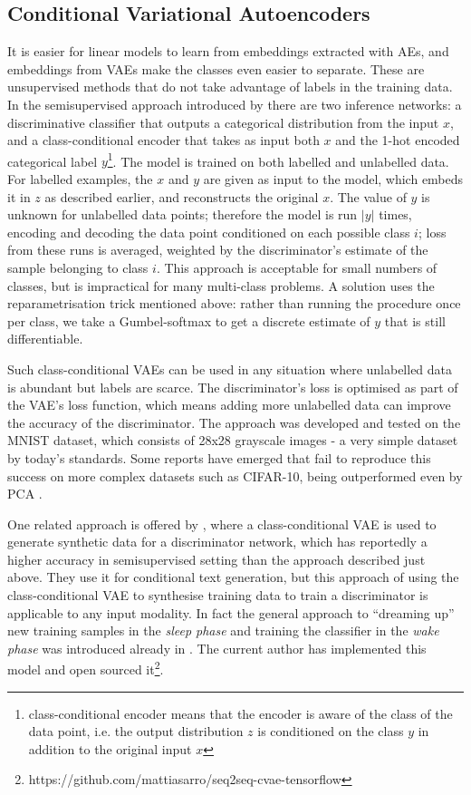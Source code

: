 \subsection{Conditional Variational Autoencoders}
\label{gans}
It is easier for linear models to learn from embeddings extracted with AEs, and embeddings from VAEs make the classes even easier to separate.
These are unsupervised methods that do not take advantage of labels in the training data.
In the semisupervised approach introduced by \cite{semi_vae} there are two inference networks: a discriminative classifier that outputs a categorical distribution from the input $x$, and a class-conditional encoder that takes as input both $x$ and the 1-hot encoded categorical label $y$\footnote{class-conditional encoder means that the encoder is aware of the class of the data point, i.e. the output distribution $z$ is conditioned on the class $y$ in addition to the original input $x$}.
The model is trained on both labelled and unlabelled data.
For labelled examples, the $x$ and $y$ are given as input to the model, which embeds it in $z$ as described earlier, and reconstructs the original $x$.
The value of $y$ is unknown for unlabelled data points; therefore the model is run $|y|$ times, encoding and decoding the data point conditioned on each possible class $i$; loss from these runs is averaged, weighted by the discriminator's estimate of the sample belonging to class $i$.
This approach is acceptable for small numbers of classes, but is impractical for many multi-class problems.
A solution uses the reparametrisation trick mentioned above: rather than running the procedure once per class, we take a Gumbel-softmax \cite{gumbel} to get a discrete estimate of $y$ that is still differentiable.

Such class-conditional VAEs can be used in any situation where unlabelled data is abundant but labels are scarce.
The discriminator's loss is optimised as part of the VAE's loss function, which means adding more unlabelled data can improve the accuracy of the discriminator.
The approach was developed and tested on the MNIST dataset, which consists of 28x28 grayscale images - a very simple dataset by today's standards.
Some reports have emerged that fail to reproduce this success on more complex datasets such as CIFAR-10, being outperformed even by PCA \cite{vae_bad}.

One related approach is offered by \cite{towards}, where a class-conditional VAE is used to generate synthetic data for a discriminator network, which has reportedly a higher accuracy in semisupervised setting than the approach described just above.
They use it for conditional text generation, but this approach of using the class-conditional VAE to synthesise training data to train a discriminator is applicable to any input modality.
In fact the general approach to ``dreaming up'' new training samples in the \textit{sleep phase} and training the classifier in the \textit{wake phase} was introduced already in \cite{wake_sleep}.
The current author has implemented this model and open sourced it\footnote{https://github.com/mattiasarro/seq2seq-cvae-tensorflow}.

